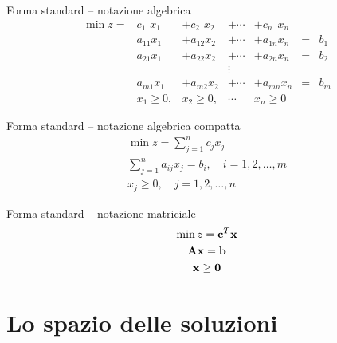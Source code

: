 \documentclass{beamer}
\begin{document}
\begin{frame}{Forma standard -- notazione algebrica}
$$
   \begin{array}{rlllllr}
    \min z = & c_{1\phantom{1}} x_1 & + c_{2\phantom{2}} x_2 & + \cdots  & + c_{n\phantom{n}} x_n \\
     & a_{11}x_1 & +a_{12}x_2 & + \cdots  & + a_{1n}x_n & = & b_1 \\
     & a_{21}x_1 & +a_{22}x_2 & + \cdots  & + a_{2n}x_n & = & b_2 \\
	 &  &  &  \vdots \\
     & a_{m1}x_1 &  +a_{m2}x_2 &  + \cdots &  + a_{mn}x_n &  = &  b_m \\
      &	x_1 \geq 0,  &  x_2 \geq 0,  &  \cdots  & x_n \geq 0
   \end{array}
$$
\end{frame}

\begin{frame}{Forma standard -- notazione algebrica compatta}
   \begin{gather*}
     \min z =  \sum_{j=1}^{n}c_{j}x_{j} \\
      \sum_{j=1}^{n} a_{ij}x_j  =  b_i,\quad i = 1, 2, \ldots, m \\
     	x_{j} \geq 0, \quad j = 1, 2, \ldots, n    
   \end{gather*}
\end{frame}

\begin{frame}{Forma standard -- notazione matriciale}
   \begin{gather*}
     \min z =  \mathbf{c}^T \mathbf{x} \\
	\mathbf{A}\mathbf{x} = \mathbf{b} \\
     	\mathbf{x} \geq \mathbf{0}    
   \end{gather*}
\end{frame}

\section{Lo spazio delle soluzioni}
\end{document}
